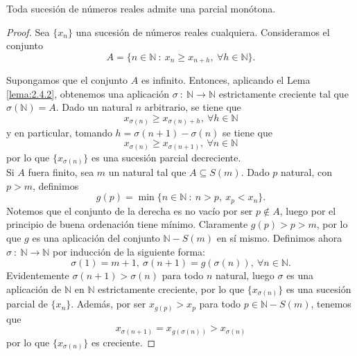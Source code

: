 \begin{lema}\label{lema:6.2.5}
    Toda sucesión de números reales admite una parcial monótona.
\end{lema}
\begin{proof}
    Sea $\{x_n\}$ una sucesión de números reales cualquiera. Consideramos el conjunto
    \begin{equation*}
        A = \{n \in \mathbb{N} ~:~ x_n \geq x_{n+h}, ~ \forall h \in \mathbb{N}\}.
    \end{equation*}
    
    Supongamos que el conjunto $A$ es infinito. Entonces, aplicando el Lema \ref{lema:2.4.2}, obtenemos una aplicación $\sigma ~:~ \mathbb{N} \longrightarrow \mathbb{N}$ estrictamente creciente tal que $\sigma(\mathbb{N}) = A$. Dado un natural $n$ arbitrario, se tiene que
    \begin{equation*}
        x_{\sigma(n)} \geq x_{\sigma(n)+h}, ~\forall h \in \mathbb{N}
    \end{equation*}
    y en particular, tomando $h = \sigma(n+1)- \sigma(n)$ se tiene que
    \begin{equation*}
        x_{\sigma(n)} \geq x_{\sigma(n+1)}, ~\forall n \in \mathbb{N}
    \end{equation*}
    por lo que $\{x_{\sigma(n)}\}$ es una sucesión parcial decreciente.\\
    
    Si $A$ fuera finito, sea $m$ un natural tal que $A \subseteq S(m)$. Dado $p$ natural, con $p > m$, definimos
    \begin{equation*}
        g(p) = \min \{n \in \mathbb{N} ~:~ n > p, ~x_p < x_n\}.
    \end{equation*}
    Notemos que el conjunto de la derecha es no vacío por ser $p \notin A$, luego por el principio de buena ordenación tiene mínimo.
    Claramente $g(p) > p > m$, por lo que $g$ es una aplicación del conjunto $\mathbb{N}-S(m)$ en sí mismo. Definimos ahora
    $\sigma ~:~ \mathbb{N} \longrightarrow \mathbb{N}$ por inducción de la siguiente forma:
    \begin{equation*}
        \sigma(1) = m+1, ~ \sigma(n+1)=g(\sigma(n)), ~ \forall n \in \mathbb{N}.
    \end{equation*}
    Evidentemente $\sigma(n+1) > \sigma(n)$ para todo $n$ natural, luego $\sigma$ es una aplicación de $\mathbb{N}$ en $\mathbb{N}$ estrictamente creciente, por lo que $\{x_{\sigma(n)}\}$ es una sucesión parcial de $\{x_n\}$. Además, por ser $x_{g(p)} > x_p$ para todo $p \in \mathbb{N}-S(m)$, tenemos que
    \begin{equation*}
        x_{\sigma(n+1)} = x_{g(\sigma(n))} > x_{\sigma(n)}
    \end{equation*}
    por lo que $\{x_{\sigma(n)}\}$ es creciente.
\end{proof}


